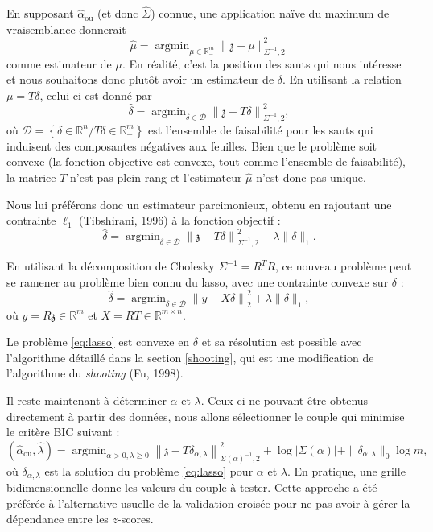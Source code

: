\documentclass[12pt,a4paper]{reedthesis}
\newcommand \RR {\mathbb{R}}
\newcommand \shiftset {\mathcal{D}}
\newcommand \ou [1]{{#1}_{\text{ou}}}
\newcommand \zs {\mathfrak{z}}
\newcommand \shifts {\delta}
\DeclareMathOperator*{\argmin}{argmin}
\theoremstyle{definition}
\theoremstyle{definition}
\theoremstyle{definition}
\theoremstyle{remark}
\begin{document}
En supposant \(\ou{\hat{\alpha}}\) (et donc \(\widehat{\Sigma}\)) connue, une application naïve du maximum de vraisemblance donnerait
\begin{equation*}
\hat{\mu} = \argmin_{\mu\in\mathbb{R}_-^m} \|\zs - \mu\|_{\Sigma^{-1}, 2}^2
\end{equation*}
comme estimateur de \(\mu\). En réalité, c'est la position des sauts qui nous intéresse et nous souhaitons donc plutôt avoir un estimateur de \(\shifts\). En utilisant la relation \(\mu = T\shifts\), celui-ci est donné par
\begin{equation*}
\hat{\delta} = \argmin_{\shifts \in \shiftset} \left\|\zs - T\shifts\right\|_{\Sigma^{-1},2}^2,
\end{equation*}
où \(\shiftset = \left\{\shifts\in \mathbb{R}^{n} / T\shifts \in\mathbb{R}_-^m\right\}\) est l'ensemble de faisabilité pour les sauts qui induisent des composantes négatives aux feuilles. Bien que le problème soit convexe (la fonction objective est convexe, tout comme l'ensemble de faisabilité), la matrice \(T\) n'est pas plein rang et l'estimateur \(\hat{\mu}\) n'est donc pas unique.

Nous lui préférons donc un estimateur parcimonieux, obtenu en rajoutant une contrainte \(\ell_1\) (Tibshirani, 1996) à la fonction objectif :
\begin{equation*}
\hat{\shifts} = \argmin_{\shifts \in \shiftset} \left\|\zs - T\shifts\right\|_{\Sigma^{-1},2}^2 + \lambda \|\shifts\|_1.
\end{equation*}
\newline

En utilisant la décomposition de Cholesky \(\Sigma^{-1} = R^TR\), ce nouveau problème peut se ramener au problème bien connu du lasso, avec une contrainte convexe sur \(\shifts\) :
\begin{equation}
\label{eq:lasso}
\hat{\shifts} = \argmin_{\shifts \in \shiftset} \left\|y - X\shifts\right\|_2^2 + \lambda \|\shifts\|_1,
\end{equation}
où \(y = R\zs \in \RR^m\) et \(X = RT \in \RR^{m \times n}\).

Le problème \eqref{eq:lasso} est convexe en \(\shifts\) et sa résolution est possible avec l'algorithme détaillé dans la section \ref{shooting}, qui est une modification de l'algorithme du \emph{shooting} (Fu, 1998).

Il reste maintenant à déterminer \(\alpha\) et \(\lambda\). Ceux-ci ne pouvant être obtenus directement à partir des données, nous allons sélectionner le couple qui minimise le critère BIC suivant :
\begin{equation*}
\left(\ou{\hat{\alpha}}, \hat{\lambda}\right) = \argmin_{\alpha > 0, \lambda \geq 0} \left\|\zs - T\shifts_{\alpha, \lambda}\right\|_{\Sigma(\alpha)^{-1},2}^2 + \log|\Sigma(\alpha)| + \|\shifts_{\alpha, \lambda}\|_0 \log{m},
\end{equation*}
où \(\shifts_{\alpha, \lambda}\) est la solution du problème \eqref{eq:lasso} pour \(\alpha\) et \(\lambda\). En pratique, une grille bidimensionnelle donne les valeurs du couple à tester. Cette approche a été préférée à l'alternative usuelle de la validation croisée pour ne pas avoir à gérer la dépendance entre les \(z\)-scores.
\end{document}
